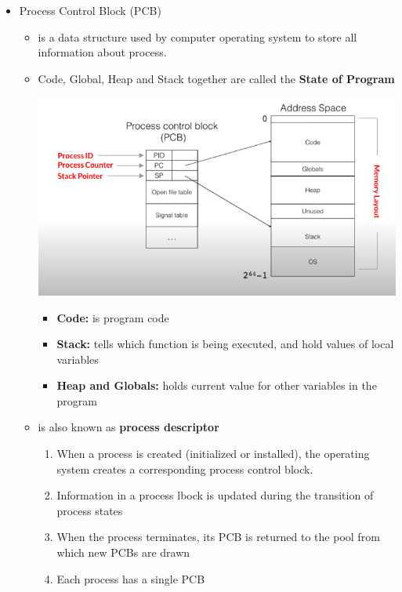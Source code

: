 \documentclass[12pt]{article}
\begin{document}
\begin{itemize}
\begin{itemize}
        \item Process Control Block (PCB)
        \begin{itemize}
            \item is a data structure used by computer operating system to
            store all information about process.
            \item Code, Global, Heap and Stack together are called the \textbf{State of Program}
            \begin{center}
            \includegraphics[width=\linewidth]{images/week_8_notes_1_3.png}
            \end{center}

            \begin{itemize}
                \item \textbf{Code:} is program code
                \item \textbf{Stack:} tells which function is being executed, and hold
                values of local variables
                \item \textbf{Heap and Globals:} holds current value for other variables in the program
            \end{itemize}

            \item is also known as \textbf{process descriptor}
            \begin{enumerate}[1.]
                \item When a process is created (initialized or installed), the
                operating system creates a corresponding process control block.
                \item Information in a process lbock is updated during the
                transition of process states
                \item When the process terminates, its PCB is returned to the pool
                from which new PCBs are drawn
                \item Each process has a single PCB
            \end{enumerate}


\end{itemize}
\end{itemize}
\end{itemize}
\end{document}
